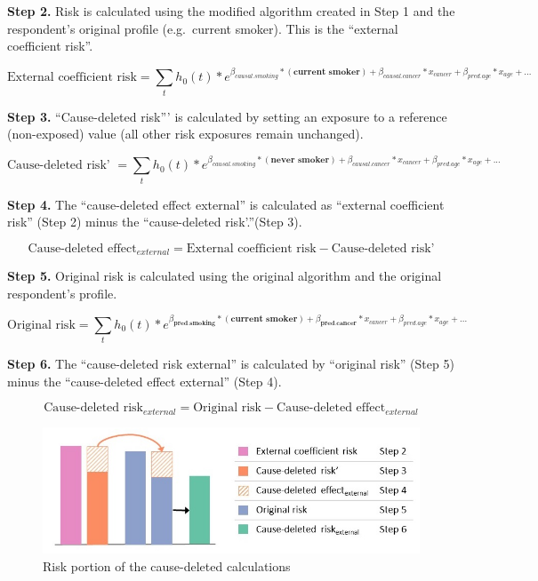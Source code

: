 \documentclass[]{book}
\begin{document}
\textbf{Step 2.} Risk is calculated using the modified algorithm created
in Step 1 and the respondent's original profile (e.g.~current smoker).
This is the ``external coefficient risk''.

\[ \text{External coefficient risk} = \sum_t h_0(t) * e^{\beta_{causal.smoking}* {(\textbf{current smoker})} + \beta_{causal.cancer}*x_{cancer} + \beta_{pred.age}*x_{age} +...}  \]

\textbf{Step 3.} ``Cause-deleted risk''' is calculated by setting an
exposure to a reference (non-exposed) value (all other risk exposures
remain unchanged).

\[ \text{Cause-deleted risk' } = \sum_t h_0(t) * e^{\beta_{causal.smoking}* {(\textbf{never smoker})} + \beta_{causal.cancer}*x_{cancer} + \beta_{pred.age}*x_{age} +...}  \]

\textbf{Step 4.} The ``cause-deleted effect external'' is calculated as
``external coefficient risk'' (Step 2) minus the ``cause-deleted
risk'.''(Step 3).

\[\text{Cause-deleted effect}_{external} = \text{External coefficient risk} - \text{Cause-deleted risk'}\]

\textbf{Step 5.} Original risk is calculated using the original
algorithm and the original respondent's profile.

\[ \text{Original risk} = \sum_t h_0(t) * e^{{\beta_\textbf{pred.smoking}}*{(\textbf{current smoker})}+{\beta_\textbf{pred.cancer}}*x_{cancer} + \beta_{pred.age}*x_{age} +...}  \]

\textbf{Step 6.} The ``cause-deleted risk external'' is calculated by
``original risk'' (Step 5) minus the ``cause-deleted effect external''
(Step 4).

\[\text{Cause-deleted risk}_{ external} = \text{Original risk} - \text{Cause-deleted effect}_{external}\]

\begin{figure}

{\centering \includegraphics{Images/Method2 only -cbf} 

}

\caption{Risk portion of the cause-deleted calculations}\label{fig:unnamed-chunk-11}
\end{figure}
\end{document}
